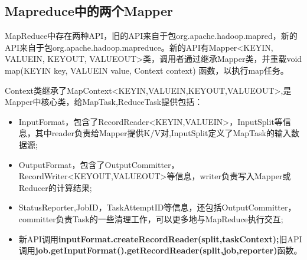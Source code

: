 \subsection{Mapreduce中的两个Mapper}
\par MapReduce中存在两种API，旧的API来自于包org.apache.hadoop.mapred，新的API来自于包org.apache.hadoop.mapreduce。新的API有Mapper<KEYIN, VALUEIN, KEYOUT, VALUEOUT>类，调用者通过继承Mapper类，并重载void map(KEYIN key, VALUEIN value, Context context) 函数，以执行map任务。
\par Context类继承了MapContext<KEYIN,VALUEIN,KEYOUT,VALUEOUT>,是Mapper中核心类，给MapTask,ReduceTask提供包括：
\begin{itemize}
\item InputFormat，包含了RecordReader<KEYIN,VALUEIN>，InputSplit等信息，其中reader负责给Mapper提供K/V对,InputSplit定义了MapTask的输入数据源;
\item OutputFormat，包含了OutputCommitter，RecordWriter<KEYOUT,VALUEOUT>等信息，writer负责写入Mapper或Reducer的计算结果;
\item StatusReporter,JobID，TaskAttemptID等信息，还包括OutputCommitter，committer负责Task的一些清理工作，可以更多地与MapReduce执行交互;
\item 新API调用\textbf{inputFormat.createRecordReader(split,taskContext);}旧API调用\textbf{job.getInputFormat().getRecordReader(split,job,reporter)}函数。
\end{itemize}

